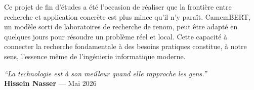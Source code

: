 Ce projet de fin d'études a été l'occasion de réaliser que la frontière
entre recherche et application concrète est plus mince qu'il n'y paraît.
CamemBERT, un modèle sorti de laboratoires de recherche de renom, peut
être adapté en quelques jours pour résoudre un problème réel et local.
Cette capacité à connecter la recherche fondamentale à des besoins
pratiques constitue, à notre sens, l'essence même de l'ingénierie
informatique moderne.

\vspace{0.5cm}

\begin{flushright}
\textit{``La technologie est à son meilleur quand elle rapproche les gens.''}\\
\vspace{0.3cm}
\textbf{Hissein Nasser} — Mai 2026
\end{flushright}

\cleardoublepage
